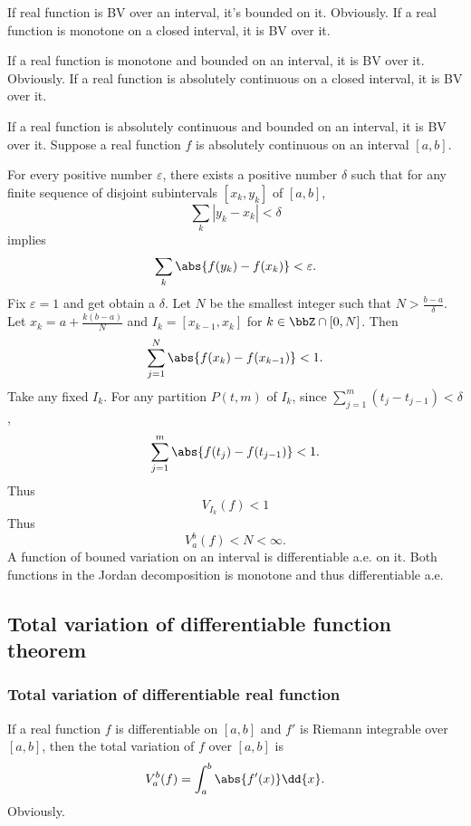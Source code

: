 If real function is BV over an interval, it's bounded on it.
\bpr
Obviously.
\epr
{}
If a real function is monotone on a closed interval, it is BV over it.

If a real function is monotone and bounded on an interval, it is BV over it.
\bpr
Obviously.
\epr
{}
If a real function is absolutely continuous on a closed interval, it is BV over it.

If a real function is absolutely continuous and bounded on an interval, it is BV over it. 
\bpr
Suppose a real function $f$ is absolutely continuous on an interval $[a,b]$.

For every positive number $\varepsilon$, there exists a positive number $\delta$ such that for any finite sequence of disjoint subintervals $[x_k, y_k]$ of $[a,b]$,
\[\sum_{k}\left|y_{k}-x_{k}\right|<\delta\]
implies
\[\sum_{k}\abs{f(y_{k})-f(x_{k})}<\varepsilon.\]
Fix $\varepsilon=1$ and get obtain a $\delta$. Let $N$ be the smallest integer such that $N>\frac{b-a}{\delta}$. Let $x_k=a+\frac{k(b-a)}{N}$ and $I_k=[x_{k-1},x_k]$ for $k\in\bbZ\cap[0,N]$. Then
\[\sum_{j=1}^N\abs{f(x_k)-f(x_{k-1})}<1.\]
Take any fixed $I_k$. For any partition $P(t,m)$ of $I_k$, since $\sum_{j=1}^m(t_j-t_{j-1})<\delta$,
\[\sum_{j=1}^m\abs{f(t_j)-f(t_{j-1})}<1.\]
Thus
\[V_{I_k}(f)<1\]
Thus
\[V_a^b(f)<N<\infty.\]
\epr
{}
A function of bouned variation on an interval is differentiable a.e. on it.
\bpr
Both functions in the Jordan decomposition is monotone and thus differentiable a.e.
\epr
\subsection{Total variation of differentiable function theorem}
\subsubsection{Total variation of differentiable real function}
If a real function $f$ is differentiable on $[a,b]$ and $f'$ is Riemann integrable over $[a,b]$, then the total variation of $f$ over $[a,b]$ is
\[V_a^b(f)=\int_a^b\abs{f'(x)}\dd{x}.\]
\bpr
Obviously.
\epr